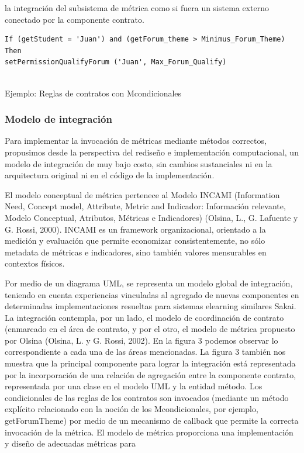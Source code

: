 \begin{itemize}
la integración del subsistema de métrica como si fuera un sistema externo
conectado por la componente contrato.


\begin{lstlisting}[languaje=Java]
If (getStudent = 'Juan') and (getForum_theme > Minimus_Forum_Theme)
Then
setPermissionQualifyForum ('Juan', Max_Forum_Qualify)
    
\end{lstlisting}



\caption {Ejemplo: Reglas de contratos con Mcondicionales}


\subsubsection {Modelo de integración}

Para implementar la invocación de métricas mediante métodos correctos, propusimos
desde la perspectiva del rediseño e implementación computacional,
un modelo de integración de muy bajo costo, sin cambios sustanciales ni en la
arquitectura original ni en el código de la implementación.

El modelo conceptual de métrica pertenece al Modelo INCAMI (Information Need, Concept model, Attribute, Metric and Indicador: Información relevante, Modelo Conceptual, Atributos, Métricas e Indicadores) (Olsina, L., G. Lafuente y G. Rossi, 2000). INCAMI es un framework organizacional, orientado a la medición y evaluación que permite economizar consistentemente, no sólo metadata de métricas e indicadores, sino también valores mensurables en contextos físicos.


Por medio de un diagrama UML, se representa un modelo global de integración, teniendo en cuenta experiencias vinculadas al agregado de nuevas componentes en determinadas implementaciones resueltas para sistemas elearning similares Sakai. La integración contempla, por un lado, el modelo de coordinación de contrato (enmarcado en el área de contrato, y por el otro, el modelo de métrica propuesto por Olsina (Olsina, L. y G. Rossi, 2002). En la figura 3 podemos observar lo correspondiente a cada una de las áreas mencionadas. La figura 3 también nos muestra que la principal componente para lograr la integración está representada por la incorporación de una relación de agregación entre la componente contrato, representada por una clase en el modelo UML y la entidad método. Los condicionales de las reglas de los contratos son
invocados (mediante un método explícito relacionado con la noción de los
Mcondicionales, por ejemplo, getForumTheme) por medio de un mecanismo
de callback que permite la correcta invocación de la métrica. El modelo de
métrica proporciona una implementación y diseño de adecuadas métricas para


\end{itemize}

